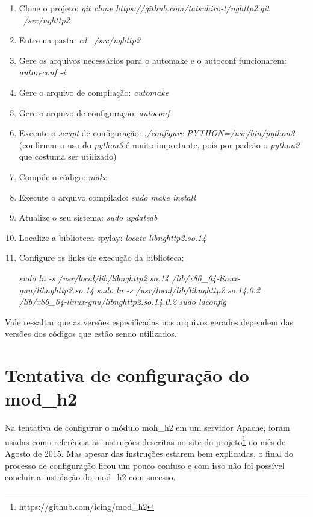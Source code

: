 \begin{apendicesenv}
\begin{enumerate}
	\item Clone o projeto: \textit{git clone https://github.com/tatsuhiro-t/nghttp2.git ~/src/nghttp2}
	\item Entre na pasta: \textit{cd ~/src/nghttp2}
	\item Gere os arquivos necessários para o automake e o autoconf funcionarem: \textit{autoreconf -i}
	\item Gere o arquivo de compilação: \textit{automake}
	\item Gere o arquivo de configuração: \textit{autoconf}
	\item Execute o \textit{script} de configuração: \textit{./configure PYTHON=/usr/bin/python3} (confirmar o uso do \textit{python3} é muito importante, pois por padrão o \textit{python2} que costuma ser utilizado)
	\item Compile o código: \textit{make}
	\item Execute o arquivo compilado: \textit{sudo make install}
	\item Atualize o seu sistema: \textit{sudo updatedb}
	\item Localize a biblioteca spylay: \textit{locate libnghttp2.so.14}
	\item Configure os links de execução da biblioteca:
		\begin{center}
			\textit{sudo ln -s /usr/local/lib/libnghttp2.so.14 /lib/x86\_64-linux-gnu/libnghttp2.so.14}
			\textit{sudo ln -s /usr/local/lib/libnghttp2.so.14.0.2 /lib/x86\_64-linux-gnu/libnghttp2.so.14.0.2}
			\textit{sudo ldconfig}
		\end{center}
\end{enumerate}

Vale ressaltar que as versões especificadas nos arquivos gerados dependem das versões dos códigos que estão sendo utilizados. 

\chapter{Tentativa de configuração do mod\_h2}
\label{apend:tentativadeconfiguracaomodh2}

Na tentativa de configurar o módulo moh\_h2 em um servidor Apache, foram usadas como referência as instruções descritas no site do projeto\footnote{https://github.com/icing/mod\_h2} no mês de Agosto de 2015. Mas apesar das instruções estarem bem explicadas, o final do processo de configuração ficou um pouco confuso e com isso não foi possível concluir a instalação do mod\_h2 com sucesso.


\end{apendicesenv}
